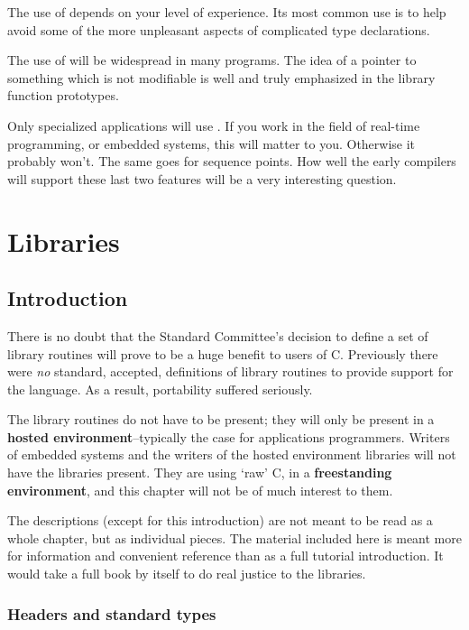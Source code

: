   The use of \typedef{} depends on your level of experience.
   Its most common use is to help avoid some of the more unpleasant aspects
   of complicated type declarations.


  The use of \const{} will be widespread in many programs.
   The idea of a pointer to something which is not modifiable is well and
   truly emphasized in the library function prototypes.


  Only specialized applications will use \volatile. If you
   work in the field of real-time programming, or embedded systems, this
   will matter to you. Otherwise it probably won't. The same goes for
   sequence points. How well the early compilers will support these last
   two features will be a very interesting question.


 \chapter{Libraries}\label{chap:libs}


        \section{Introduction}
        

  

  There is no doubt that the Standard Committee's decision to
   define a set of library routines will prove to be a huge
   benefit to users of C.  Previously there were \textit{no} standard,
   accepted, definitions of library routines to provide support
   for the language.  As a result, portability suffered
   seriously.


  The library routines do not have to be present; they will
   only be present in a \textbf{hosted environment}--typically the case
   for applications programmers.  Writers of embedded systems
   and the writers of the hosted environment libraries will not
   have the libraries present.  They are using `raw' C, in a
   \textbf{freestanding environment}, and this chapter will not be of
   much interest to them.


  The descriptions (except for this introduction) are not
   meant to be read as a whole chapter, but as individual
   pieces.  The material included here is meant more for
   information and convenient reference than as a full tutorial
   introduction.  It would take a full book by itself to do
   real justice to the libraries.


  \subsection{Headers and standard types}
   

